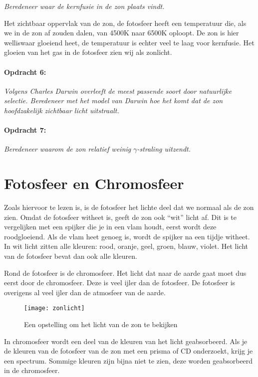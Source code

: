 \emph{Beredeneer waar de kernfusie in de zon plaats vindt.}

Het zichtbaar oppervlak van de zon, de fotosfeer heeft een temperatuur
die, als we in de zon af zouden dalen, van 4500K naar 6500K oploopt.
De zon is hier welliswaar gloeiend heet, de temperatuur is echter
veel te laag voor kernfusie. Het gloeien van het gas in de fotosfeer
zien wij als zonlicht. 


\paragraph*{Opdracht 6:}

\emph{Volgens Charles Darwin overleeft de meest passende soort door
natuurlijke selectie. Beredeneer met het model van Darwin hoe het
komt dat de zon hoofdzakelijk zichtbaar licht uitstraalt.}


\paragraph*{Opdracht 7:}

\emph{Beredeneer waarom de zon relatief weinig $\gamma$-straling
uitzendt.}


\section{Fotosfeer en Chromosfeer}

Zoals hiervoor te lezen is, is de fotosfeer het lichte deel dat we
normaal als de zon zien. Omdat de fotosfeer witheet is, geeft de zon
ook ``wit'' licht af. Dit is te vergelijken met een spijker die
je in een vlam houdt, eerst wordt deze roodgloeiend. Als de vlam heet
genoeg is, wordt de spijker na een tijdje witheet. In wit licht zitten
alle kleuren: rood, oranje, geel, groen, blauw, violet. Het licht
van de fotosfeer bevat dan ook alle kleuren.

Rond de fotosfeer is de chromosfeer. Het licht dat naar de aarde gaat
moet dus eerst door de chromosfeer. Deze is veel ijler dan de fotosfeer.
De fotosfeer is overigens al veel ijler dan de atmosfeer van de aarde.

\begin{figure}[h]
\centering
\texttt{[image: zonlicht]}

\caption{Een opstelling om het licht van de zon te bekijken}
\end{figure}


In chromosfeer wordt een deel van de kleuren van het licht geabsorbeerd.
Als je de kleuren van de fotosfeer van de zon met een prisma of CD
onderzoekt, krijg je een spectrum. Sommige kleuren zijn bijna niet
te zien, deze worden geabsorbeerd in de chromosfeer.


